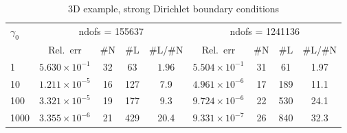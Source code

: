 \documentclass[12pt]{article}
\begin{document}
\begin{table}
\begin{tabular}{lcccccccc}\toprule
    $\gamma_0$ & \multicolumn{4}{c}{ndofs = 155637} & \multicolumn{4}{c}{ndofs = 1241136}
     \\\cmidrule(lr){2-5}\cmidrule(lr){6-9}
                & Rel.~err &\#N& \#L & \#L/\#N& Rel.~err &\#N& \#L & \#L/\#N\\\midrule
 1 &$ 5.630 \times 10^{-1}$& 32 & 63 & $1.96$ &$5.504\times 10^{-1}$ & 31 & 61& 1.97\\
 10 & $1.211\times 10^{-5}$ & 16 & 127 & 7.9 &$4.961\times 10^{-6}$ & 17 & 189 & 11.1\\
 100  &  $3.321\times 10^{-5}$ & 19 & 177 & 9.3&  $9.724\times 10^{-6}$ & 22 & 530 & 24.1\\
 1000 & $3.355\times 10^{-6}$ & 21 & 429 & 20.4 & $9.331 \times 10^{-7}$ & 26 & 840 & 32.3 \\
     \bottomrule
     \end{tabular}
     \caption{3D example, strong Dirichlet boundary conditions}
    \end{table}
\end{document}
